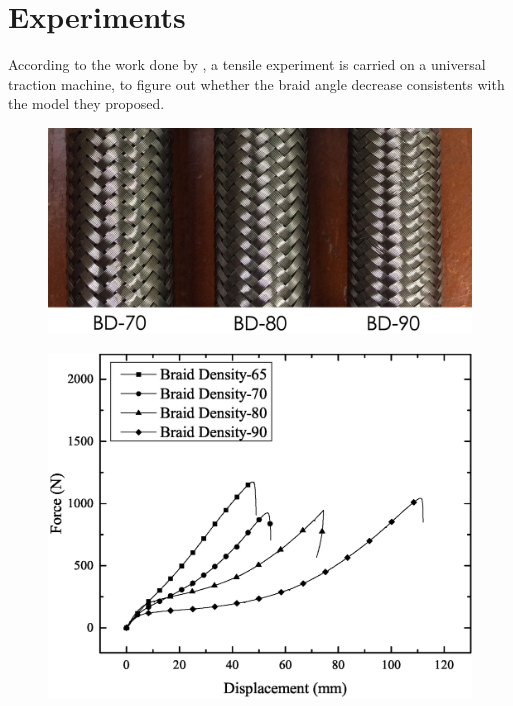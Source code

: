 

\section{Experiments}
\label{experiment}

According to the work done by \citeauthor{Hachemi:2011jn} \cite{Hachemi:2011jn}, a tensile experiment is carried on a universal traction machine, to figure out whether the braid angle decrease consistents with the model they proposed.





\begin{figure}[!htbp]
    \centering
    \includegraphics[width=0.8\linewidth]{figure/experiment/18mm-hose-specimen}
    \caption{}
    \label{fig:18mm-hose-specimen}
\end{figure}



\begin{figure}
    \centering
    \includegraphics[width=0.7\linewidth]{figure/experiment/E3-G4/Graph01}
    \caption{}
    \label{fig:graph01}
\end{figure}







